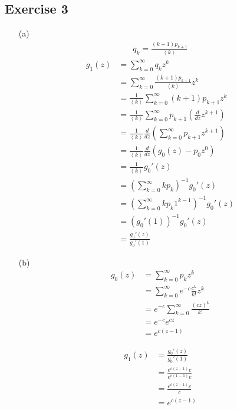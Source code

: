 \documentclass{article}
\newcommand{\angles}[1]{\left \langle #1 \right \rangle}
\begin{document}
\newpage

\subsection*{Exercise 3}

\begin{enumerate}
  \item[(a)]
  \begin{align*}
    q_k = \frac{(k + 1) p_{k + 1}}{\angles{k}}
  \end{align*}
  \begin{align*}
    g_1(z) &= \sum_{k = 0}^{\infty} q_k z^k \\
    &= \sum_{k = 0}^{\infty} \frac{(k + 1) p_{k + 1}}{\angles{k}} z^k \\
    &= \frac{1}{\angles{k}} \sum_{k = 0}^{\infty} (k + 1) p_{k + 1} z^k \\
    &= \frac{1}{\angles{k}} \sum_{k = 0}^{\infty} p_{k + 1} \left( \frac{d}{dz} z^{k + 1} \right) \\
    &= \frac{1}{\angles{k}} \frac{d}{dz} \left( \sum_{k = 0}^{\infty} p_{k + 1} z^{k + 1} \right) \\
    &= \frac{1}{\angles{k}} \frac{d}{dz} (g_0(z) - p_0 z^0) \\
    &= \frac{1}{\angles{k}} g_0'(z) \\
    &= \left( \sum_{k = 0}^{\infty} k p_k \right)^{-1} g_0'(z) \\
    &= \left( \sum_{k = 0}^{\infty} k p_k 1^{k - 1} \right)^{-1} g_0'(z) \\
    &= \left( g_0'(1) \right)^{-1} g_0'(z) \\
    &= \frac{g_0'(z)}{g_0'(1)}
  \end{align*}

  \item[(b)]
  \begin{align*}
    g_0(z) &= \sum_{k = 0}^{\infty} p_k z^k \\
    &= \sum_{k = 0}^{\infty} e^{-c} \frac{c^k}{k!} z^k \\
    &= e^{-c} \sum_{k = 0}^{\infty} \frac{(cz)^k}{k!} \\
    &= e^{-c} e^{cz} \\
    &= \boxed{e^{c(z - 1)}}
  \end{align*}

  \begin{align*}
    g_1(z) &= \frac{g_0'(z)}{g_0'(1)} \\
    &= \frac{e^{c(z - 1)} c}{e^{c(1 - 1)} c} \\
    &= \frac{e^{c(z - 1)} c}{c} \\
    &= e^{c(z - 1)}
  \end{align*}


\end{enumerate}
\end{document}
